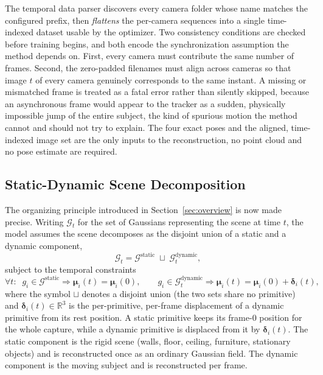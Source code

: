 \noindent
The temporal data parser discovers every camera folder whose name matches the
configured prefix, then \emph{flattens} the per-camera sequences into a single
time-indexed dataset usable by the optimizer. Two consistency conditions are checked
before training begins, and both encode the synchronization assumption the method
depends on. First, every camera must contribute the same number of frames. Second,
the zero-padded filenames must align across cameras so that image $t$ of every camera
genuinely corresponds to the same instant. A missing or mismatched frame is treated
as a fatal error rather than silently skipped, because an asynchronous frame would
appear to the tracker as a sudden, physically impossible jump of the entire subject,
the kind of spurious motion the method cannot and should not try to explain. The four exact poses and the aligned, time-indexed image set are the only
inputs to the reconstruction, no point cloud and no pose estimate are required.

\subsection{Static-Dynamic Scene Decomposition}
\label{sec:decomposition}

The organizing principle introduced in Section~\ref{sec:overview} is now made
precise. Writing $\mathcal{G}_t$ for the set of Gaussians representing the scene at
time $t$, the model assumes the scene decomposes as the disjoint union of a static
and a dynamic component,
\begin{equation}
    \mathcal{G}_t = \mathcal{G}^{\text{static}} \;\sqcup\; \mathcal{G}^{\text{dynamic}}_t,
\end{equation}
subject to the temporal constraints
\begin{equation}
    \forall t:\;\; g_i \in \mathcal{G}^{\text{static}} \Rightarrow \boldsymbol{\mu}_i(t) = \boldsymbol{\mu}_i(0),
    \qquad
    g_i \in \mathcal{G}^{\text{dynamic}}_t \Rightarrow \boldsymbol{\mu}_i(t) = \boldsymbol{\mu}_i(0) + \boldsymbol{\delta}_i(t),
\end{equation}
where the symbol $\sqcup$ denotes a disjoint union (the two sets share no primitive)
and $\boldsymbol{\delta}_i(t) \in \mathbb{R}^3$ is the per-primitive, per-frame
displacement of a dynamic primitive from its rest position. A static
primitive keeps its frame-$0$ position for the whole capture, while a dynamic
primitive is displaced from it by $\boldsymbol{\delta}_i(t)$. The static component is
the rigid scene (walls, floor, ceiling, furniture, stationary objects) and is
reconstructed once as an ordinary Gaussian field. The dynamic component is the moving
subject and is reconstructed per frame.

